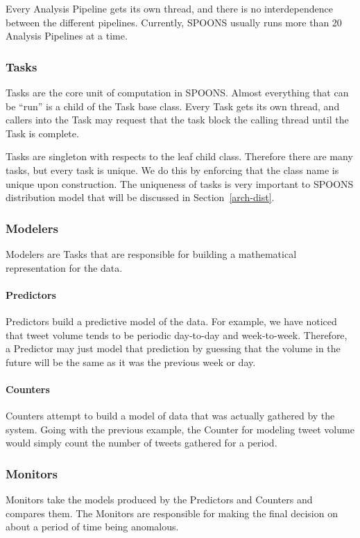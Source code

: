 \documentclass[12pt]{ucthesis}
\begin{document}
Every Analysis Pipeline gets its own thread, and there is no interdependence between the different pipelines.
Currently, SPOONS usually runs more than 20 Analysis Pipelines at a time.

\subsubsection{Tasks}
\label{arch-tasks}
Tasks are the core unit of computation in SPOONS. Almost everything that can be ``run'' is a child of the Task base
class. Every Task gets its own thread, and callers into the Task may request that the task block the calling thread
until the Task is complete.

Tasks are singleton with respects to the leaf child class. Therefore there are many tasks, but every task is
unique. We do this by enforcing that the class name is unique upon construction. The uniqueness of tasks is very
important to SPOONS distribution model that will be discussed in Section~\ref{arch-dist}.

\subsubsection{Modelers}
\label{arch-modelers}
Modelers are Tasks that are responsible for building a mathematical representation for the data.

\paragraph{Predictors}
\label{arch-predictors}
Predictors build a predictive model of the data. For example, we have noticed that tweet volume tends to be
periodic day-to-day and week-to-week. Therefore, a Predictor may just model that prediction by guessing that the volume
in the future will be the same as it was the previous week or day.

\paragraph{Counters}
\label{arch-counters}
Counters attempt to build a model of data that was actually gathered by the system. Going with the previous example,
the Counter for modeling tweet volume would simply count the number of tweets gathered for a period.

\subsubsection{Monitors}
\label{arch-monitors}
Monitors take the models produced by the Predictors and Counters and compares them. The Monitors are responsible for
making the final decision on about a period of time being anomalous.
\end{document}
